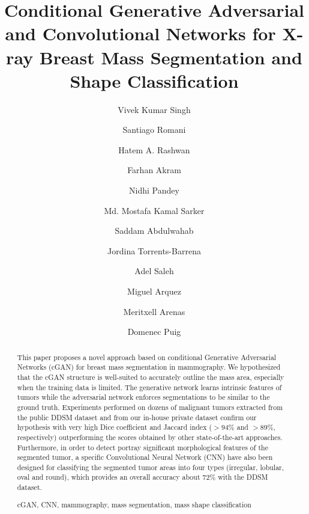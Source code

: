 \documentclass[runningheads,a4paper]{llncs}
\newcommand{\keywords}[1]{\par\addvspace\baselineskip
\noindent\keywordname\enspace\ignorespaces#1}
\begin{document}
\mainmatter  %

\title{Conditional Generative Adversarial and Convolutional Networks for X-ray Breast Mass Segmentation and Shape Classification}



\author{Vivek Kumar Singh \and Santiago Romani \and Hatem A. Rashwan  \and Farhan Akram \and Nidhi Pandey \and Md. Mostafa Kamal Sarker \and Saddam Abdulwahab\and Jordina Torrents-Barrena \and Adel Saleh \and Miguel Arquez\and Meritxell Arenas\and
Domenec Puig}







\maketitle


\begin{abstract}
This paper proposes a novel approach based on conditional Generative Adversarial Networks (cGAN) for breast mass segmentation in mammography. We hypothesized that the cGAN structure is well-suited to accurately outline the mass area, especially when the training data is limited. The generative network learns intrinsic features of tumors while the adversarial network enforces segmentations to be similar to the ground truth. Experiments performed on dozens of malignant tumors extracted from the public DDSM dataset and from our in-house private dataset confirm our hypothesis with very high Dice coefficient and Jaccard index ($>94\%$ and $>89\%$, respectively) outperforming the scores obtained by other state-of-the-art approaches. Furthermore, in order to detect  portray significant morphological features of the segmented tumor, a specific Convolutional Neural Network (CNN) have also been designed for classifying the segmented tumor areas into four types (irregular, lobular, oval and round), which provides an overall accuracy about 72\% with the DDSM dataset.
\keywords{cGAN, CNN, mammography, mass segmentation, mass shape classification}
\end{abstract}
\end{document}
